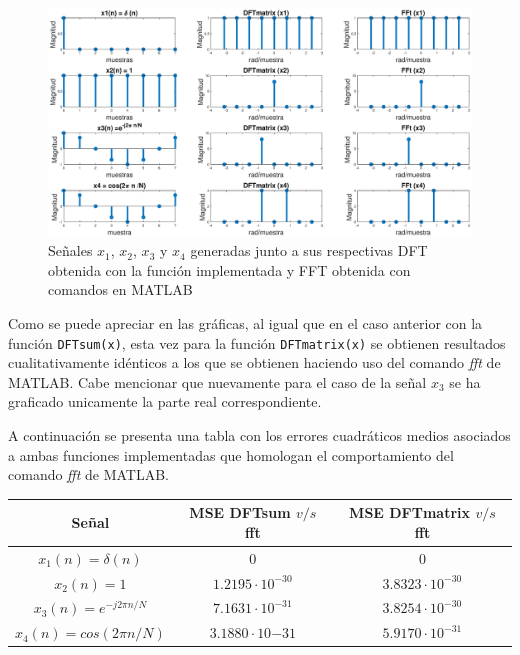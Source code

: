 \begin{enumerate}
    
    \begin{figure}[H]
        \centering
        \includegraphics[scale = 0.3]{Figuras/p4_1-DFTmatrix.eps}
        \caption{Señales $x_1$, $x_2$, $x_3$ y $x_4$ generadas junto a sus respectivas DFT obtenida con la función implementada y FFT obtenida con comandos en MATLAB}
        \label{DFTmatrix}
    \end{figure}


Como se puede apreciar en las gráficas, al igual que en el caso anterior con la función \texttt{DFTsum(x)}, esta vez para la función \texttt{DFTmatrix(x)} se obtienen resultados cualitativamente idénticos a los que se obtienen haciendo uso del comando \textit{fft} de MATLAB. Cabe mencionar que nuevamente para el caso de la señal $x_3$ se ha graficado unicamente la parte real correspondiente.

A continuación se presenta una tabla con los errores cuadráticos medios asociados a ambas funciones implementadas que homologan el comportamiento del comando \textit{fft} de MATLAB.


  
 
 \begin{table}[H]
        \centering
        \begin{tabular}{|c|c|c|}
        \hline
         Señal    & MSE DFTsum $v/s$ fft & MSE DFTmatrix $v/s$ fft  \\
         \hline
         $x_1(n) = \delta (n)$   & $0$ & $0$ \\
         \hline
          $x_2(n) = 1$   &   $1.2195\cdot 10^{-30}$  & $3.8323\cdot 10^{-30}$\\
         \hline
            $ x_3(n) =e^{-j2 \pi n /N}$ &   $7.1631\cdot 10^{-31} $ & $3.8254\cdot 10^{-30}$  \\
         \hline
        
         $ x_4(n) = cos(2\pi n /N)$  &    $3.1880\cdot 10{-31}  $ & $5.9170\cdot 10^{-31}$\\
         \hline



\end{tabular}
\end{table}
\end{enumerate}
